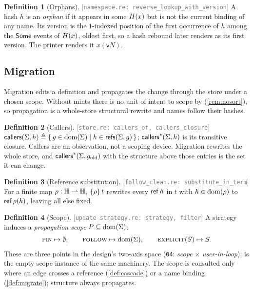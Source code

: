 \documentclass[11pt]{article}
\theoremstyle{definition}
\newtheorem{definition}{Definition}[section]
\theoremstyle{plain}
\theoremstyle{remark}
\newcommand{\src}[1]{{\footnotesize\textcolor{gray}{[\texttt{#1}]}}}
\begin{document}
\begin{definition}[Orphans]\label{def:orphan}
\src{namespace.re: reverse\_lookup\_with\_version} A hash $h$ is an \emph{orphan} if it appears
in some $H(x)$ but is not the current binding of any name. Its version is the $1$-indexed
position of the first occurrence of $h$ among the $\mathsf{Some}$ events of $H(x)$, oldest
first, so a hash rebound later renders as its first version. The printer renders it
$x(\mathsf{v}N)$.
\end{definition}

\subsection{Migration}

Migration edits a definition and propagates the change through the store under a chosen scope.
Without mints there is no unit of intent to scope by (\cref{rem:nosort}), so propagation is a
whole-store structural rewrite and names follow their hashes.

\begin{definition}[Callers]\label{def:callers}
\src{store.re: callers\_of, callers\_closure}
$\mathsf{callers}(\Sigma,h) \triangleq \{\, g \in \operatorname{dom}(\Sigma) \mid h \in \mathsf{refs}(\Sigma,g)\,\}$;
$\mathsf{callers}^{*}(\Sigma,h)$ is its transitive closure. Callers are an observation, not a scoping
device. Migration rewrites the whole store, and $\mathsf{callers}^{*}(\Sigma,g_{\mathrm{old}})$ with
the structure above those entries is the set it can change.
\end{definition}

\begin{definition}[Reference substitution]\label{def:substrefs}
\src{follow\_clean.re: substitute\_in\_term} For a finite map $\rho : \mathbb{H} \rightharpoonup \mathbb{H}$,
$\{\rho\}\,t$ rewrites every $\mathsf{ref}\,h$ in $t$ with $h \in \operatorname{dom}(\rho)$ to $\mathsf{ref}\,\rho(h)$,
leaving all else fixed.
\end{definition}

\begin{definition}[Scope]\label{def:strategy}
\src{update\_strategy.re: strategy, filter} A strategy induces a \emph{propagation scope}
$P \subseteq \operatorname{dom}(\Sigma)$:
\[
  \textsc{pin} \mapsto \emptyset,\qquad
  \textsc{follow} \mapsto \operatorname{dom}(\Sigma),\qquad
  \textsc{explicit}(S) \mapsto S.
\]
These are three points in the design's two-axis space (\texttt{04}: \emph{scope} $\times$
\emph{user-in-loop}); \Pin{} is the empty-scope instance of the same machinery. The scope is
consulted only where an edge crosses a reference (\cref{def:cascade}) or a name binding
(\cref{def:migrate}); structure always propagates.
\end{definition}
\end{document}
